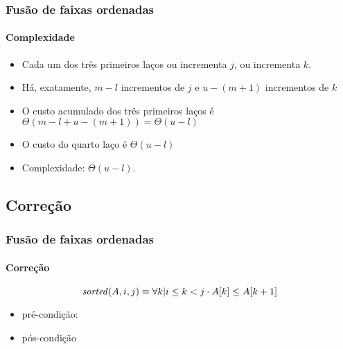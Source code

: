 \documentclass{beamer}
\begin{document}
\begin{frame}

  \frametitle{Fusão de faixas ordenadas}
  \framesubtitle{Complexidade}

  \begin{itemize}
  \item Cada um dos três primeiros laços ou incrementa $j$, ou incrementa $k$.
  \item Há, exatamente, $m-l$ incrementos de $j$ e $u-(m+1)$ incrementos de $k$
  \item O custo acumulado dos três primeiros laços é $\Theta(m-l+u-(m+1))=
    \Theta(u-l)$
  \item O custo do quarto laço é $\Theta(u-l)$
  \item Complexidade: $\Theta(u-l)$.
  \end{itemize}

\end{frame}

\subsection{Correção}


\begin{frame}

  \frametitle{Fusão de faixas ordenadas}
  \framesubtitle{Correção}

\begin{definition}[$\id{sorted}$]
$$
  \id{sorted}(A, i, j) \equiv \forall k | i \le k < j \cdot A[k] \le A[k+1]
$$
\end{definition}

\pause

\begin{small}
\begin{codebox}
\end{codebox}
\end{small}

  \begin{itemize}
    \item pré-condição:

    \item pós-condição

  \end{itemize}

\end{frame}
\end{document}
